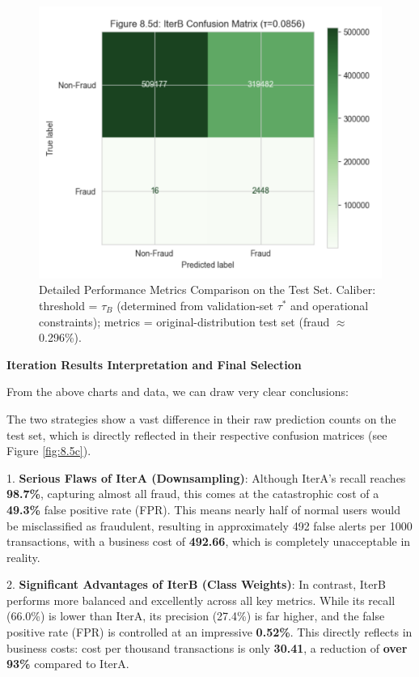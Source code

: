 \documentclass[sigplan,screen]{acmart}
\begin{document}
\begin{figure}[h!]
    \centering
    \includegraphics[width=0.9\columnwidth]{8.5d.png}
    \caption{Detailed Performance Metrics Comparison on the Test Set. Caliber: threshold = $\tau_B$ (determined from validation-set $\tau^*$ and operational constraints); metrics = original-distribution test set (fraud $\approx$ 0.296\%).}
    \label{fig:8.5d}
\end{figure}

\textbf{Iteration Results Interpretation and Final Selection}

From the above charts and data, we can draw very clear conclusions:

The two strategies show a vast difference in their raw prediction counts on the test set, which is directly reflected in their respective confusion matrices (see Figure \ref{fig:8.5c}).

1. \textbf{Serious Flaws of IterA (Downsampling)}: Although IterA's recall reaches \textbf{98.7\%}, capturing almost all fraud, this comes at the catastrophic cost of a \textbf{49.3\%} false positive rate (FPR). This means nearly half of normal users would be misclassified as fraudulent, resulting in approximately 492 false alerts per 1000 transactions, with a business cost of \textbf{492.66}, which is completely unacceptable in reality.

2. \textbf{Significant Advantages of IterB (Class Weights)}: In contrast, IterB performs more balanced and excellently across all key metrics. While its recall (66.0\%) is lower than IterA, its precision (27.4\%) is far higher, and the false positive rate (FPR) is controlled at an impressive \textbf{0.52\%}. This directly reflects in business costs: cost per thousand transactions is only \textbf{30.41}, a reduction of \textbf{over 93\%} compared to IterA.
\end{document}
